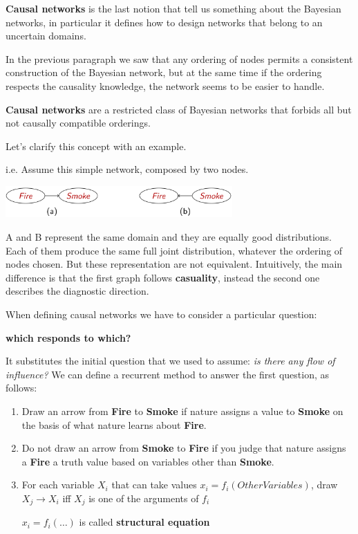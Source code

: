 \textbf{Causal networks} is the last notion that tell us something about the Bayesian networks, in particular it defines how to design networks that belong to an uncertain
domains. \vspace{3.5pt}

In the previous paragraph we saw that any ordering of nodes permits a consistent construction of the Bayesian network, but at the same time if the ordering respects the 
causality knowledge, the network seems to be easier to handle.
\begin{definition}
    \textbf{Causal networks} are a restricted class of Bayesian networks that forbids all but not causally compatible orderings.
\end{definition}
Let's clarify this concept with an example.
\begin{example}
    i.e. Assume this simple network, composed by two nodes. \vspace{3.5pt}
    \begin{center}
        \includegraphics[width=0.65\textwidth]{img/img7.png}
    \end{center} \vspace{3.5pt}
    A and B represent the same domain and they are equally good distributions. Each of them produce the same full joint distribution, whatever the ordering of nodes chosen. 
    But these representation are not equivalent. Intuitively, the main difference is that the first graph follows \textbf{casuality}, instead the second one describes the
    diagnostic direction.
\end{example}
When defining causal networks we have to consider a particular question:
\begin{center}
    \textbf{which responds to which?}
\end{center}
It substitutes the initial question that we used to assume: \textit{is there any flow of influence?} 
We can define a recurrent method to answer the first question, as follows:
\begin{enumerate}
    \item Draw an arrow from \textbf{Fire} to \textbf{Smoke} if nature assigns a value to \textbf{Smoke} on the basis of what nature learns about \textbf{Fire}.
    \item Do not draw an arrow from \textbf{Smoke} to \textbf{Fire} if you judge that nature assigns a \textbf{Fire} a truth value based on variables other than \textbf{Smoke}.
    \item For each variable $X_i$ that can take values $x_i=f_i(OtherVariables)$, draw $X_j \rightarrow X_i$ iff $X_j$ is one of the arguments of $f_i$ 
    \begin{center}
        $x_i = f_i(\dots)$ is called \textbf{structural equation}
    \end{center}
\end{enumerate}
